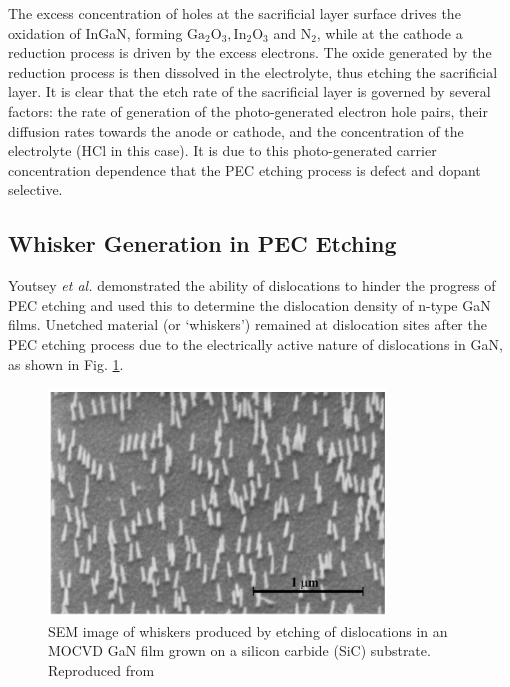 The excess concentration of holes at the sacrificial layer surface drives the oxidation of InGaN, forming $\mathrm{Ga_{2}O_{3}, In_{2}O_{3}}$ and $\mathrm{N_{2}}$, while at the cathode a reduction process is driven by the excess electrons. The oxide generated by the reduction process is then dissolved in the electrolyte, thus etching the sacrificial layer. It is clear that the etch rate of the sacrificial layer is governed by several factors: the rate of generation of the photo-generated electron hole pairs, their diffusion rates towards the anode or cathode, and the concentration of the electrolyte (HCl in this case). It is due to this photo-generated carrier concentration dependence that the PEC etching process is defect and dopant selective.

\subsection{Whisker Generation in PEC Etching}
\label{Whisker section}
Youtsey \textit{et al.} demonstrated the ability of dislocations to hinder the progress of PEC etching and used this to determine the dislocation density of n-type GaN films. Unetched material (or ‘whiskers’) remained at dislocation sites after the PEC etching process due to the electrically active nature of dislocations in GaN, as shown in Fig. \ref{PECwhiskeryoutsey}.

\begin{figure}[h]
 	\centering
 	\includegraphics[width=0.8\textwidth]{Figs/Ch4/youtseywhisker.png}
 	\caption {SEM image of whiskers produced by etching of dislocations in an MOCVD GaN film grown on a silicon carbide (SiC) substrate. Reproduced from \cite{Youtsey1999}}
 	\label{PECwhiskeryoutsey}
\end{figure}
\FloatBarrier 


